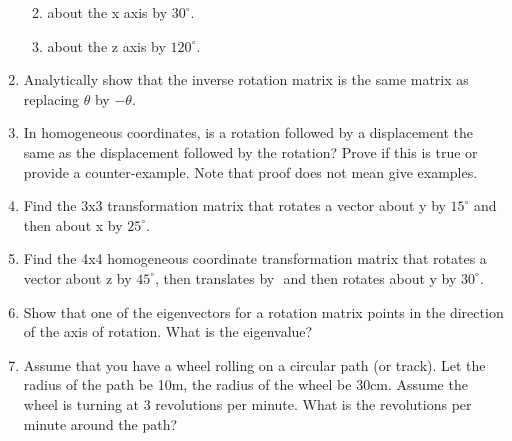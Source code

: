 \begin{enumerate}
  \begin{enumerate}
  \def\labelenumii{\alph{enumii}.}
  \tightlist
  \item
    about the x axis by \(30^\circ\).
  \item
    about the z axis by \(120^\circ\).
  \end{enumerate}
\item
  Analytically show that the inverse rotation matrix is the same matrix
  as replacing \(\theta\) by \(-\theta\).
\item
  In homogeneous coordinates, is a rotation followed by a displacement
  the same as the displacement followed by the rotation? Prove if this
  is true or provide a counter-example. Note that proof does not mean
  give examples.
\item
  Find the 3x3 transformation matrix that rotates a vector about y by
  \(15^\circ\) and then about x by \(25^\circ\).
\item
  Find the 4x4 homogeneous coordinate transformation matrix that rotates
  a vector about z by \(45^\circ\), then translates by \(<1,2,3>\) and
  then rotates about y by \(30^\circ\).
\item
  Show that one of the eigenvectors for a rotation matrix points in the
  direction of the axis of rotation. What is the eigenvalue?
\item
  Assume that you have a wheel rolling on a circular path (or track).
  Let the radius of the path be 10m, the radius of the wheel be 30cm.
  Assume the wheel is turning at 3 revolutions per minute. What is the
  revolutions per minute around the path?
\end{enumerate}
